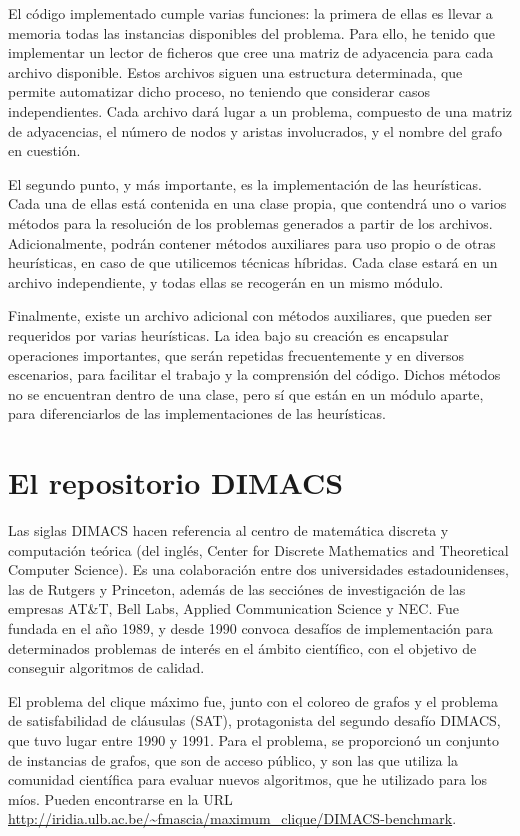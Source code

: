 El código implementado cumple varias funciones: la primera de ellas es llevar a
memoria todas las instancias disponibles del problema. Para ello, he tenido que
implementar un lector de ficheros que cree una matriz de adyacencia para cada archivo
disponible. Estos archivos siguen una estructura determinada, que permite
automatizar dicho proceso, no teniendo que considerar casos independientes.
Cada archivo dará lugar a un problema, compuesto de una matriz de adyacencias,
el número de nodos y aristas involucrados, y el nombre del grafo en cuestión.

El segundo punto, y más importante, es la implementación de las heurísticas.
Cada una de ellas está contenida en una clase propia, que contendrá uno o varios
métodos para la resolución de los problemas generados a partir de los archivos.
Adicionalmente, podrán contener métodos auxiliares para uso propio o de otras
heurísticas, en caso de que utilicemos técnicas híbridas. Cada clase estará
en un archivo independiente, y todas ellas se recogerán en un mismo módulo.

Finalmente, existe un archivo adicional con métodos auxiliares, que pueden ser
requeridos por varias heurísticas. La idea bajo su creación es encapsular
operaciones importantes, que serán repetidas frecuentemente y en diversos
escenarios, para facilitar el trabajo y la comprensión del código. Dichos
métodos no se encuentran dentro de una clase, pero sí que están en un
módulo aparte, para diferenciarlos de las implementaciones de las heurísticas.


\section{El repositorio DIMACS}
Las siglas DIMACS hacen referencia al centro de matemática discreta y computación teórica
(del inglés, Center for Discrete Mathematics and Theoretical Computer Science). Es una colaboración
entre dos universidades estadounidenses, las de Rutgers y Princeton, además de las secciónes de investigación
de las empresas AT\&T, Bell Labs, Applied Communication Science y NEC. Fue fundada en el año 1989,
y desde 1990 convoca desafíos de implementación para determinados problemas de interés en
el ámbito científico, con el objetivo de conseguir algoritmos de calidad.

El problema del clique máximo fue, junto con el coloreo de grafos y el problema de satisfabilidad
de cláusulas (SAT), protagonista del segundo desafío DIMACS, que tuvo lugar entre 1990 y 1991.
Para el problema, se proporcionó un conjunto de instancias de grafos, que son de acceso público,
y son las que utiliza la comunidad científica para evaluar nuevos algoritmos, que he utilizado
para los míos. Pueden encontrarse en la URL \url{http://iridia.ulb.ac.be/~fmascia/maximum_clique/DIMACS-benchmark}.

